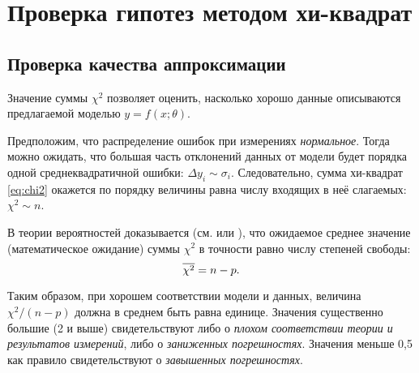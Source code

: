 \section{Проверка гипотез методом хи-квадрат}

\subsection{Проверка качества аппроксимации}

Значение суммы $\chi^2$ позволяет оценить, насколько хорошо данные описываются
предлагаемой моделью $y=f(x;\theta)$.

Предположим, что распределение ошибок при измерениях \emph{нормальное}.
Тогда можно ожидать, что большая часть отклонений данных от модели будет
порядка одной среднеквадратичной ошибки: $\Delta y_{i}\sim\sigma_{i}$.
Следовательно, сумма хи-квадрат \eqref{eq:chi2} окажется по порядку
величины равна числу входящих в неё слагаемых: $\chi^{2}\sim n$.


В теории вероятностей доказывается (см. \cite{hudson} или \cite{idie}),
что ожидаемое среднее значение (математическое ожидание) суммы $\chi^{2}$
в точности равно числу степеней свободы:
\[
\overline{\chi^{2}}=n-p.
\]

Таким образом, при хорошем соответствии модели и данных,
величина $\chi^2 / (n-p) $ должна в среднем быть равна единице.
Значения существенно большие (2 и выше) свидетельствуют либо о
\emph{плохом соответствии теории и результатов измерений},
    либо о \emph{заниженных погрешностях}.
    Значения меньше 0,5 как правило свидетельствуют о \emph{завышенных погрешностях}.


